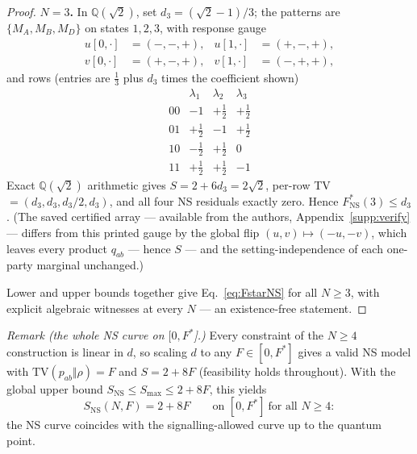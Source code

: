 \documentclass[aps,pra,reprint,superscriptaddress,floatfix]{revtex4-2}
\newcommand{\TV}{\mathrm{TV}}
\begin{document}
\begin{proof}
\textbf{$N=3$.} In $\mathbb{Q}(\sqrt2)$, set $d_3=(\sqrt{2}-1)/3$; the
patterns are $\{M_A,M_B,M_D\}$ on states $1,2,3$, with response gauge
\begin{equation}
\begin{aligned}
u[0,\cdot]&=(-,-,+), & u[1,\cdot]&=(+,-,+),\\
v[0,\cdot]&=(+,-,+), & v[1,\cdot]&=(-,+,+),
\end{aligned}
\label{eq:ns3gauge}
\end{equation}
and rows (entries are $\frac13$ plus $d_3$ times the coefficient shown)
\begin{equation}
\begin{array}{c|ccc}
 & \lambda_1 & \lambda_2 & \lambda_3\\ \hline
00 & -1 & +\tfrac12 & +\tfrac12\\[2pt]
01 & +\tfrac12 & -1 & +\tfrac12\\[2pt]
10 & -\tfrac12 & +\tfrac12 & 0\\[2pt]
11 & +\tfrac12 & +\tfrac12 & -1
\end{array}
\label{eq:ns3rows}
\end{equation}
Exact $\mathbb{Q}(\sqrt2)$ arithmetic gives $S=2+6d_3=2\sqrt{2}$, per-row TV
$=(d_3,d_3,d_3/2,d_3)$, and all four NS residuals exactly zero. Hence
$F^*_{\mathrm{NS}}(3)\le d_3$. (The saved certified array --- available from
the authors, Appendix~\ref{supp:verify} --- differs from this printed gauge
by the global flip $(u,v)\mapsto(-u,-v)$, which leaves every product $q_{ab}$
--- hence $S$ --- and the setting-independence of each one-party marginal
unchanged.)

Lower and upper bounds together give Eq.~\eqref{eq:FstarNS} for all $N\ge3$,
with explicit algebraic witnesses at every $N$ --- an existence-free
statement.
\end{proof}

\noindent
\emph{Remark (the whole NS curve on $[0,F^*$].)} Every constraint of the
$N\ge4$ construction is linear in $d$, so scaling $d$ to any
$F\in[0,F^*]$ gives a valid NS model with $\TV(p_{ab}\Vert\rho)=F$ and
$S=2+8F$ (feasibility holds throughout). With the global upper bound
$S_{\mathrm{NS}}\le S_{\max}\le 2+8F$, this yields
\begin{equation}
S_{\mathrm{NS}}(N,F) = 2+8F \qquad\text{on }[0,F^*]\ \text{for all } N\ge4:
\label{eq:nscurve}
\end{equation}
the NS curve coincides with the signalling-allowed curve up to the quantum
point.
\end{document}
